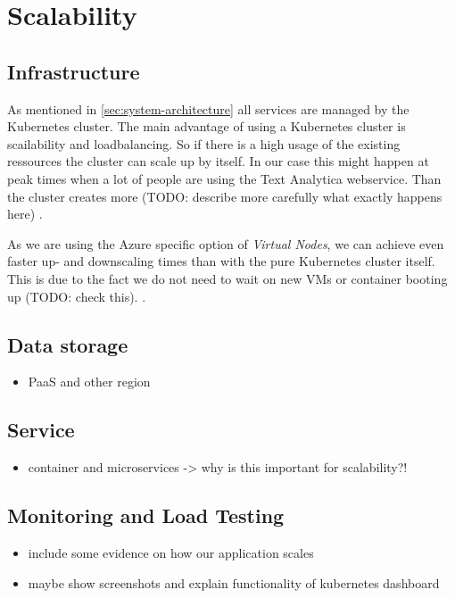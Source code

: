 \documentclass[conference]{IEEEtran}
\begin{document}
\section{Scalability}
\label{sec:scalability}
\subsection{Infrastructure}
As mentioned in \cref{sec:system-architecture} all services are managed by the Kubernetes cluster.
The main advantage of using a Kubernetes cluster is scailability and loadbalancing. So if there is a high usage of the
existing ressources the cluster can scale up by itself. In our case this might happen at peak times when a lot of people
are using the Text Analytica webservice. Than the cluster creates more (TODO:  describe more carefully what exactly happens here)
\cite{MicrosoftAzureKubernetesService}.

As we are using the Azure specific option of \textit{Virtual Nodes}, we can achieve even faster up- and downscaling times
than with the pure Kubernetes cluster itself. This is due to the fact we do not need to wait on new VMs or container booting up (TODO: check this).
\cite{MicrosoftVirtualNode}.

\subsection{Data storage}
\begin{itemize}
	\item PaaS and other region
\end{itemize}

\subsection{Service}
\begin{itemize}
	\item container and microservices -> why is this important for scalability?!
\end{itemize}

\subsection{Monitoring and Load Testing}
\begin{itemize}
	\item include some evidence on how our application scales
	\item maybe show screenshots and explain functionality of kubernetes dashboard
\end{itemize}
\end{document}
